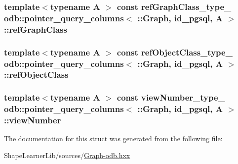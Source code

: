 \subsubsection[{ref\+Graph\+Class}]{\setlength{\rightskip}{0pt plus 5cm}template$<$typename A $>$ const {\bf ref\+Graph\+Class\+\_\+type\+\_\+} odb\+::pointer\+\_\+query\+\_\+columns$<$ \+::{\bf Graph}, id\+\_\+pgsql, A $>$\+::ref\+Graph\+Class\hspace{0.3cm}{\ttfamily [static]}}\label{structodb_1_1pointer__query__columns_3_01_1_1_graph_00_01id__pgsql_00_01_a_01_4_a9cb5ceb8ac091439eab4aeb64ecdd266}
\hypertarget{structodb_1_1pointer__query__columns_3_01_1_1_graph_00_01id__pgsql_00_01_a_01_4_afa5872d939cf250830b67089317ec250}{}
\subsubsection[{ref\+Object\+Class}]{\setlength{\rightskip}{0pt plus 5cm}template$<$typename A $>$ const {\bf ref\+Object\+Class\+\_\+type\+\_\+} odb\+::pointer\+\_\+query\+\_\+columns$<$ \+::{\bf Graph}, id\+\_\+pgsql, A $>$\+::ref\+Object\+Class\hspace{0.3cm}{\ttfamily [static]}}\label{structodb_1_1pointer__query__columns_3_01_1_1_graph_00_01id__pgsql_00_01_a_01_4_afa5872d939cf250830b67089317ec250}
\hypertarget{structodb_1_1pointer__query__columns_3_01_1_1_graph_00_01id__pgsql_00_01_a_01_4_a93eb871dbc95c471843ad8179c0def52}{}
\subsubsection[{view\+Number}]{\setlength{\rightskip}{0pt plus 5cm}template$<$typename A $>$ const {\bf view\+Number\+\_\+type\+\_\+} odb\+::pointer\+\_\+query\+\_\+columns$<$ \+::{\bf Graph}, id\+\_\+pgsql, A $>$\+::view\+Number\hspace{0.3cm}{\ttfamily [static]}}\label{structodb_1_1pointer__query__columns_3_01_1_1_graph_00_01id__pgsql_00_01_a_01_4_a93eb871dbc95c471843ad8179c0def52}


The documentation for this struct was generated from the following file\+:\begin{DoxyCompactItemize}
\item 
Shape\+Learner\+Lib/sources/\hyperlink{_graph-odb_8hxx}{Graph-\/odb.\+hxx}\end{DoxyCompactItemize}
